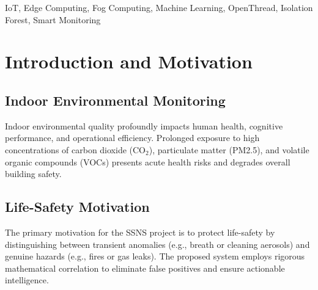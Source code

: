 \documentclass[conference]{IEEEtran}
\begin{document}
\begin{abstract}
The rapid deployment of Internet of Things (IoT) platforms in indoor environments requires highly scalable, reliable, and intelligent systems. This report details the complete implementation of the Thread-Based Intelligent Indoor Environmental Monitoring System, henceforth referred to as the Smart Sensor Network System (SSNS), a multi-tier platform designed for real-time environmental monitoring. The proposed architecture integrates IEEE 802.15.4 OpenThread mesh networks, fog computing, and a decoupled cloud backend to process high-frequency telemetry. The system employs a multi-engine alert architecture combining deterministic safety thresholds, dynamic statistical heuristics, and an advanced Machine Learning (ML) pipeline based on Isolation Forests. This document presents the hardware constraints, software implementation, mathematical models, and architectural decisions informed by ASHRAE \cite{b1,b15}, OSHA \cite{b14}, WHO \cite{b3}, EPA \cite{b4}, and WELL \cite{b5} guidelines.
\end{abstract}

\begin{IEEEkeywords}
IoT, Edge Computing, Fog Computing, Machine Learning, OpenThread, Isolation Forest, Smart Monitoring
\end{IEEEkeywords}

\tableofcontents
\listoffigures
\listoftables

\section{Introduction and Motivation}
\subsection{Indoor Environmental Monitoring}
Indoor environmental quality profoundly impacts human health, cognitive performance, and operational efficiency. Prolonged exposure to high concentrations of carbon dioxide (CO$_2$), particulate matter (PM2.5), and volatile organic compounds (VOCs) presents acute health risks and degrades overall building safety.

\subsection{Life-Safety Motivation}
The primary motivation for the SSNS project is to protect life-safety by distinguishing between transient anomalies (e.g., breath or cleaning aerosols) and genuine hazards (e.g., fires or gas leaks). The proposed system employs rigorous mathematical correlation to eliminate false positives and ensure actionable intelligence.
\end{document}
